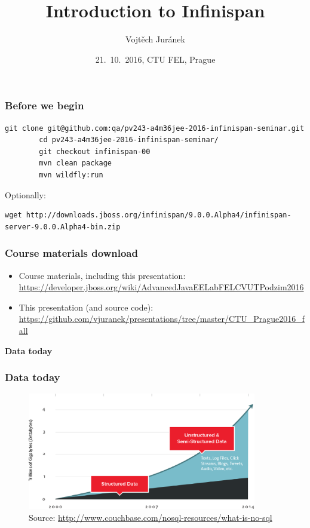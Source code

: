 \documentclass[10pt,utf8]{beamer}
\title{Introduction to Infinispan}
\author{Vojtěch Juránek}
\institute[Red Hat]{JBoss - a division by Red Hat}
\date{21.~10.~2016, CTU FEL, Prague}
\begin{document}


\begin{frame}[fragile]
	\frametitle{Before we begin}
	\begin{lstlisting}[style=Bash]
		git clone git@github.com:qa/pv243-a4m36jee-2016-infinispan-seminar.git
		cd pv243-a4m36jee-2016-infinispan-seminar/
		git checkout infinispan-00
		mvn clean package
		mvn wildfly:run
	\end{lstlisting}
	\vspace{0.5cm}
	Optionally:
	\begin{lstlisting}[style=Bash]
		wget http://downloads.jboss.org/infinispan/9.0.0.Alpha4/infinispan-server-9.0.0.Alpha4-bin.zip
	\end{lstlisting}
\end{frame}

\begin{frame}
 \titlepage
\end{frame}

\begin{frame}
	\frametitle{Course materials download}
	\scriptsize{
	\begin{itemize}
		\item Course materials, including this presentation:\\
		\color{blue}\url{https://developer.jboss.org/wiki/AdvancedJavaEELabFELCVUTPodzim2016}\color{black}
		\item This presentation (and source code):\\ 
		\color{blue}\url{https://github.com/vjuranek/presentations/tree/master/CTU_Prague2016_fall}\color{black}
	\end{itemize}
	}
\end{frame}

\begin{frame}
	\centering
	\huge{\textbf{Data today}}
\end{frame}


\begin{frame}
	\frametitle{Data today}
	\begin{figure}
		\centering
		\includegraphics[width=10cm]{./img/why-nosql-2.eps}
		\caption{\tiny{Source: \url{http://www.couchbase.com/nosql-resources/what-is-no-sql}}}
	\end{figure}
\end{frame}
\end{document}
